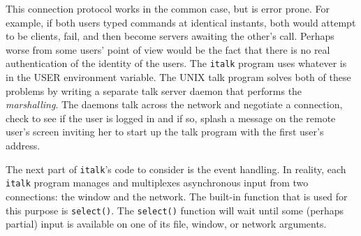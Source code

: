 
This connection protocol works in the common case, but is error prone.
For example, if both users typed commands at identical instants, both
would attempt to be clients, fail, and then become servers awaiting the
other's call. Perhaps worse from some
users' point of view would be the fact that there is
no real authentication of the identity of the users. The \texttt{italk}
program uses whatever is in the USER environment variable. The UNIX talk program solves both
of these problems by writing a separate talk server daemon that
performs the \textit{marshalling}. The daemons talk across the network
and negotiate a connection, check to see if the user is logged in and
if so, splash a message on the remote user's screen
inviting her to start up the talk program with the first
user's address.

The next part of \texttt{italk}'s code to consider is
the event handling. In reality, each \texttt{italk} program manages and
multiplexes asynchronous input from two connections: the window and the
network. The built-in function that is used for this purpose is
\texttt{select()}. The \texttt{select()} function will wait until some
(perhaps partial) input is available on one of its file, window, or
network arguments.

